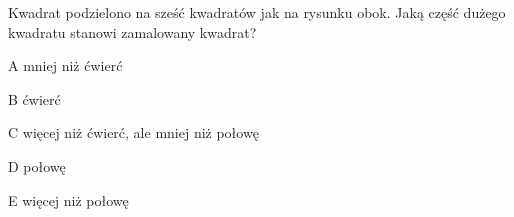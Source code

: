 \begin{tresc}
Kwadrat podzielono na sześć kwadratów jak na rysunku obok. Jaką część dużego kwadratu stanowi zamalowany kwadrat?
\end{tresc}
\begin{wariant}{A} mniej niż ćwierć \end{wariant}
\begin{wariant}{B} ćwierć \end{wariant}
\begin{wariant}{C} więcej niż ćwierć, ale mniej niż połowę \end{wariant}
\begin{wariant}{D} połowę \end{wariant}
\begin{wariant}{E} więcej niż połowę \end{wariant}
